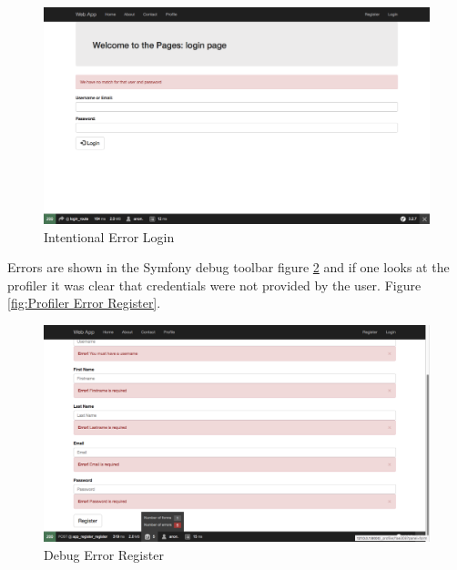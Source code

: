\begin{figure}[htbp]
   \centering
   \includegraphics[width=400pt]{figures/intentional_error_login.png} %
   \caption{Intentional Error Login}
   \label{fig:Intentional Error Login}
\end{figure}

Errors are shown in the Symfony debug toolbar figure \ref{fig:Debug Error Register} and if one looks at the profiler it was clear that credentials were not provided by the user. Figure \ref{fig:Profiler Error Register}.

\begin{figure}[htbp]
   \centering
   \includegraphics[width=400pt]{figures/profiler_intentional_error_register.png} %
   \caption{Debug Error Register}
   \label{fig:Debug Error Register}
\end{figure}

